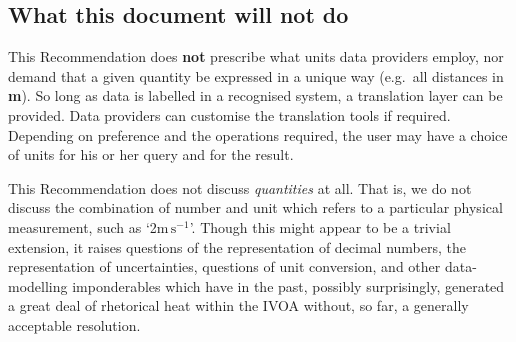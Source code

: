 \documentclass[11pt,notitlepage,onecolumn]{ivoa}
\def\eg{e.g.~}
\newcommand{\unit}[1]{\textbf{\textsf{\color{orange}#1}}}
\newcommand{\violet}{\textcolor[rgb]{0.50,0.00,0.50}}
\begin{document}



\subsection {What this document will not do}
\label{sec:outofscope}

This Recommendation does \textbf{not} prescribe what units data providers
employ, nor demand that a given quantity be expressed in a
unique way (\eg all distances in \unit{m}).  So long as data is labelled 
in a recognised system, a
translation layer can be provided. Data providers can customise the
translation tools if required. Depending on preference and the
operations required, the user may have a choice of units for his or her
query and for the result.

This Recommendation does not discuss \emph{quantities} at all.  That
is, we do not discuss the combination of number and unit which refers
to a particular physical measurement, such as `2$\mathrm m\,\mathrm
s^{-1}$'.  Though this might appear to be a trivial extension, it
raises questions of the representation of decimal numbers, the
representation of uncertainties, questions of unit conversion, and
other data-modelling imponderables which have in the past, possibly
surprisingly, generated a great deal of rhetorical heat within the
IVOA without, so far, a generally acceptable resolution.


\end{document}
